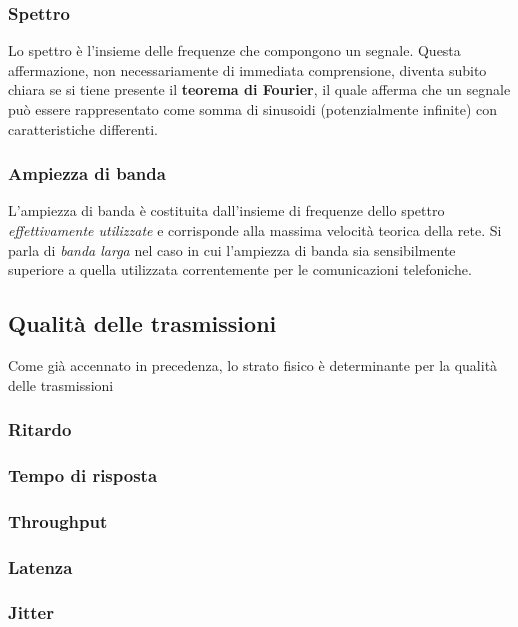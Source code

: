 \documentclass[a4paper,11pt]{paper}
\begin{document}
\subsubsection{Spettro}
Lo spettro è l'insieme delle frequenze che compongono un segnale. Questa affermazione, non necessariamente di immediata comprensione, diventa subito chiara se si tiene presente il \textbf{teorema di Fourier}, il quale afferma che un segnale può essere rappresentato come somma di sinusoidi (potenzialmente infinite) con caratteristiche differenti.

\subsubsection{Ampiezza di banda}
L'ampiezza di banda è costituita dall'insieme di frequenze dello spettro \textit{effettivamente utilizzate} e corrisponde alla massima velocità teorica della rete. Si parla di \textit{banda larga} nel caso in cui l'ampiezza di banda sia sensibilmente superiore a quella utilizzata correntemente per le comunicazioni telefoniche.

\subsection{Qualità delle trasmissioni}
Come già accennato in precedenza, lo strato fisico è determinante per la qualità delle trasmissioni
\subsubsection{Ritardo}
\subsubsection{Tempo di risposta}
\subsubsection{Throughput}
\subsubsection{Latenza}
\subsubsection{Jitter}
\end{document}
